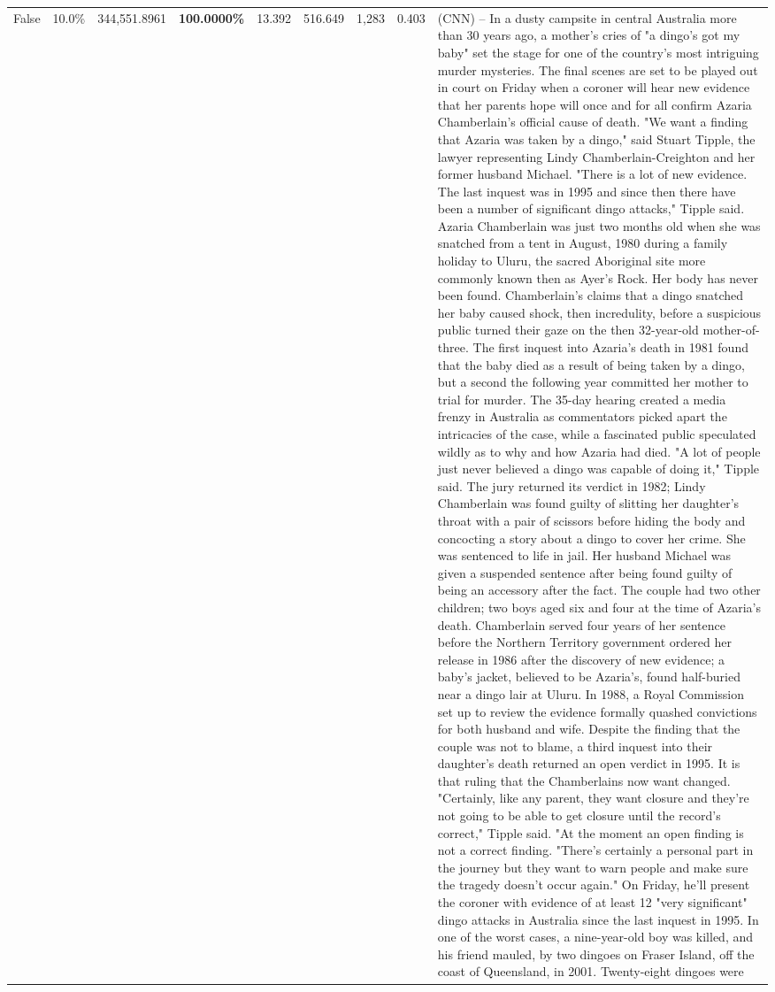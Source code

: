 \begin{table}[H]
\begin{tabular}{lllrlllll}
False & 10.0\% & 344,551.8961 & \bfseries \color{red} 100.0000\% & 13.392 & 516.649 & 1,283 & 0.403 & (CNN) -- In a dusty campsite in central Australia more than 30 years ago, a mother's cries of "a dingo's got my baby" set the stage for one of the country's most intriguing murder mysteries. The final scenes are set to be played out in court on Friday when a coroner will hear new evidence that her parents hope will once and for all confirm Azaria Chamberlain's official cause of death. "We want a finding that Azaria was taken by a dingo," said Stuart Tipple, the lawyer representing Lindy Chamberlain-Creighton and her former husband Michael. "There is a lot of new evidence. The last inquest was in 1995 and since then there have been a number of significant dingo attacks," Tipple said. Azaria Chamberlain was just two months old when she was snatched from a tent in August, 1980 during a family holiday to Uluru, the sacred Aboriginal site more commonly known then as Ayer's Rock. Her body has never been found. Chamberlain's claims that a dingo snatched her baby caused shock, then incredulity, before a suspicious public turned their gaze on the then 32-year-old mother-of-three. The first inquest into Azaria's death in 1981 found that the baby died as a result of being taken by a dingo, but a second the following year committed her mother to trial for murder. The 35-day hearing created a media frenzy in Australia as commentators picked apart the intricacies of the case, while a fascinated public speculated wildly as to why and how Azaria had died. "A lot of people just never believed a dingo was capable of doing it," Tipple said. The jury returned its verdict in 1982; Lindy Chamberlain was found guilty of slitting her daughter's throat with a pair of scissors before hiding the body and concocting a story about a dingo to cover her crime. She was sentenced to life in jail. Her husband Michael was given a suspended sentence after being found guilty of being an accessory after the fact. The couple had two other children; two boys aged six and four at the time of Azaria's death. Chamberlain served four years of her sentence before the Northern Territory government ordered her release in 1986 after the discovery of new evidence; a baby's jacket, believed to be Azaria's, found half-buried near a dingo lair at Uluru. In 1988, a Royal Commission set up to review the evidence formally quashed convictions for both husband and wife. Despite the finding that the couple was not to blame, a third inquest into their daughter's death returned an open verdict in 1995. It is that ruling that the Chamberlains now want changed. "Certainly, like any parent, they want closure and they're not going to be able to get closure until the record's correct," Tipple said. "At the moment an open finding is not a correct finding. "There's certainly a personal part in the journey but they want to warn people and make sure the tragedy doesn't occur again." On Friday, he'll present the coroner with evidence of at least 12 "very significant" dingo attacks in Australia since the last inquest in 1995. In one of the worst cases, a nine-year-old boy was killed, and his friend mauled, by two dingoes on Fraser Island, off the coast of Queensland, in 2001. Twenty-eight dingoes were 
\end{tabular}
\end{table}

